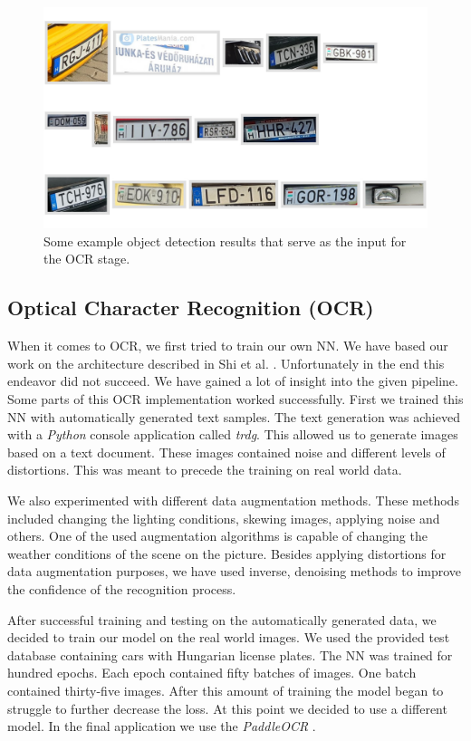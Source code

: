 \begin{figure}
    \includegraphics[width=\textwidth]{figures/yolo/cutout_montage.jpg}
    \caption{Some example object detection results that serve as the
    input for the OCR stage.}
    \label{fig:cutout-montage}
\end{figure}

\subsection{Optical Character Recognition (OCR)}

When it comes to \ac{OCR}, we first tried to train our own \ac{NN}.  We have
based our work on the architecture described in Shi et al. \cite{7801919}.
Unfortunately in the end this endeavor did not succeed.  We have gained a lot
of insight into the given pipeline.  Some parts of this \ac{OCR} implementation
worked successfully.  First we trained this \ac{NN} with automatically generated
text samples.  The text generation was achieved with a \emph{Python} console
application called \emph{trdg}.  This allowed us to generate images based on
a text document.  These images contained noise and different levels of
distortions.  This was meant to precede the training on real world data.

We also experimented with different data augmentation methods.  These methods
included changing the lighting conditions, skewing images, applying noise and
others.  One of the used augmentation algorithms is capable of changing the
weather conditions of the scene on the picture.  Besides applying distortions
for data augmentation purposes, we have used inverse, denoising methods to
improve the confidence of the recognition process.

After successful training and testing on the automatically generated data, we
decided to train our model on the real world images.  We used the provided test
database containing cars with Hungarian license plates.  The \ac{NN} was trained
for hundred epochs.  Each epoch contained fifty batches of images.  One batch
contained thirty-five images.  After this amount of training the model began to
struggle to further decrease the loss.  At this point we decided to use
a different model.  In the final application we use the \emph{PaddleOCR}
\cite{DBLP:journals/corr/abs-2009-09941}.

